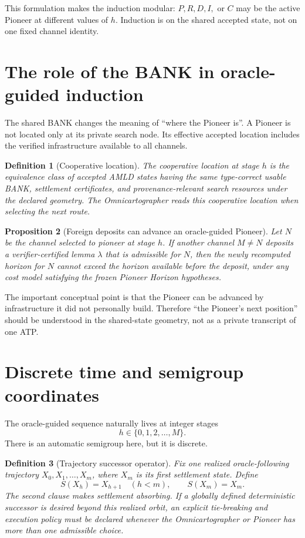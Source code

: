 \documentclass[11pt]{article}
\newtheorem{definition}{Definition}[section]
\newtheorem{proposition}[definition]{Proposition}
\theoremstyle{remark}
\begin{document}
This formulation makes the induction modular: $P,R,D,I,$ or $C$ may be the active Pioneer at different values of $h$. Induction is on the shared accepted state, not on one fixed channel identity.

\section{The role of the BANK in oracle-guided induction}

The shared BANK changes the meaning of ``where the Pioneer is''. A Pioneer is not located only at its private search node. Its effective accepted location includes the verified infrastructure available to all channels.

\begin{definition}[Cooperative location]
The cooperative location at stage $h$ is the equivalence class of accepted AMLD states having the same type-correct usable BANK, settlement certificates, and provenance-relevant search resources under the declared geometry. The Omnicartographer reads this cooperative location when selecting the next route.
\end{definition}

\begin{proposition}[Foreign deposits can advance an oracle-guided Pioneer]
Let $N$ be the channel selected to pioneer at stage $h$. If another channel $M\ne N$ deposits a verifier-certified lemma $\lambda$ that is admissible for $N$, then the newly recomputed horizon for $N$ cannot exceed the horizon available before the deposit, under any cost model satisfying the frozen Pioneer Horizon hypotheses.
\end{proposition}

The important conceptual point is that the Pioneer can be advanced by infrastructure it did not personally build. Therefore ``the Pioneer's next position'' should be understood in the shared-state geometry, not as a private transcript of one ATP.

\section{Discrete time and semigroup coordinates}

The oracle-guided sequence naturally lives at integer stages
\[
h\in\{0,1,2,\dots,M\}.
\]
There is an automatic semigroup here, but it is discrete.

\begin{definition}[Trajectory successor operator]
Fix one realized oracle-following trajectory $X_0,X_1,\dots,X_m$, where $X_m$ is its first settlement state. Define
\[
S(X_h)=X_{h+1}\quad(h<m),\qquad S(X_m)=X_m.
\]
The second clause makes settlement absorbing. If a globally defined deterministic successor is desired beyond this realized orbit, an explicit tie-breaking and execution policy must be declared whenever the Omnicartographer or Pioneer has more than one admissible choice.
\end{definition}
\end{document}
